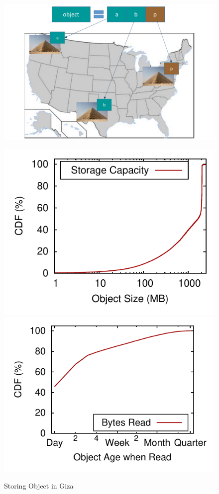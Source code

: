 

\begin{figure}[!htbp]
\centering
\begin{minipage}{0.3\textwidth}%
\centering
\includegraphics[width=\textwidth]{images/giza_example_crop_fit}
\caption{Storing Object in Giza}
\label{fig:giza_example}
\end{minipage}%
\begin{minipage}{0.7\textwidth}%
\captionsetup{type=figure}
\centering
		\hspace{-1.5em}
    \subcaptionbox{\label{fig:object_size-storage_capacity}}
      {\includegraphics[height=0.275\textwidth]{data/object_size-storage_capacity}}%
		\hspace{-1em}
    \subcaptionbox{\label{fig:write_read_gap-bytes_read}}
      {\includegraphics[height=0.275\textwidth]{data/write_read_gap-bytes_read}}%

\end{minipage}
\end{figure}
